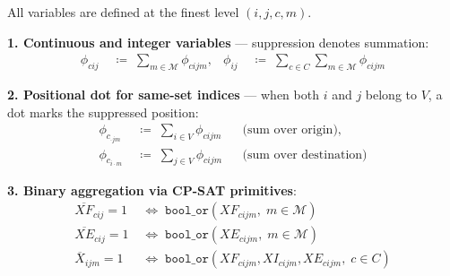 
\begin{convention}
\label{conv:notation}
All variables are defined at the finest level $(i,j,c,m)$.

\medskip
\noindent\textbf{1. Continuous and integer variables} ---
suppression denotes summation:
\begin{align*}
  \phi_{cij} &\;\coloneqq\; \sum_{m\in\mathcal{M}} \phi_{cijm},
  &
  \phi_{ij} &\;\coloneqq\;
    \sum_{c\in C}\sum_{m\in\mathcal{M}} \phi_{cijm}
\end{align*}

\medskip
\noindent\textbf{2. Positional dot for same-set indices} ---
when both $i$ and $j$ belong to $V$, a dot marks the suppressed
position:
\begin{align*}
  \phi_{c}_{\cdot jm} &\;\coloneqq\; \sum_{i\in V}\phi_{cijm}
    &&\text{(sum over origin)},\\
  \phi_{c}_{i\cdot m} &\;\coloneqq\; \sum_{j\in V}\phi_{cijm}
    &&\text{(sum over destination)}
\end{align*}

\medskip
\noindent\textbf{3. Binary aggregation via CP-SAT primitives}:
\begin{align*}
  \overline{XF}_{cij}=1
    &\;\Leftrightarrow\;
    \texttt{bool\_or}(XF_{cijm},\;m\in\mathcal{M}) \\
  \overline{XE}_{cij}=1
    &\;\Leftrightarrow\;
    \texttt{bool\_or}(XE_{cijm},\;m\in\mathcal{M}) \\
  \overline{X}_{ijm}=1
    &\;\Leftrightarrow\;
    \texttt{bool\_or}(XF_{cijm},XI_{cijm},XE_{cijm},\;c\in C)
\end{align*}
\end{convention}

